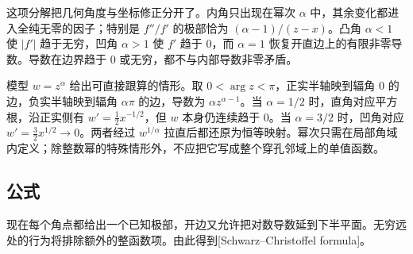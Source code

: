 这项分解把几何角度与坐标修正分开了。内角只出现在幂次 \(\alpha\) 中，其余变化都进入全纯无零的因子；特别是 \(f''/f'\) 的极部恰为 \((\alpha-1)/(z-x)\)。凸角 \(\alpha<1\) 使 \(|f'|\) 趋于无穷，凹角 \(\alpha>1\) 使 \(f'\) 趋于 \(0\)，而 \(\alpha=1\) 恢复开直边上的有限非零导数。导数在边界趋于 \(0\) 或无穷，都不与内部导数非零矛盾。

\ProseParagraphBreak
模型 \(w=z^\alpha\) 给出可直接跟算的情形。取 \(0<\arg z<\pi\)，正实半轴映到辐角 \(0\) 的边，负实半轴映到辐角 \(\alpha\pi\) 的边，导数为 \(\alpha z^{\alpha-1}\)。当 \(\alpha=1/2\) 时，直角对应平方根，沿正实侧有 \(w'=\tfrac12x^{-1/2}\)，但 \(w\) 本身仍连续趋于 \(0\)。当 \(\alpha=3/2\) 时，凹角对应 \(w'=\tfrac32x^{1/2}\rightarrow0\)。两者经过 \(w^{1/\alpha}\) 拉直后都还原为恒等映射。幂次只需在局部角域内定义；除整数幂的特殊情形外，不应把它写成整个穿孔邻域上的单值函数。

\subsection{公式}
\label{b3:subsec:070303}

现在每个角点都给出一个已知极部，开边又允许把对数导数延到下半平面。无穷远处的行为将排除额外的整函数项。由此得到[Schwarz--Christoffel formula]。

